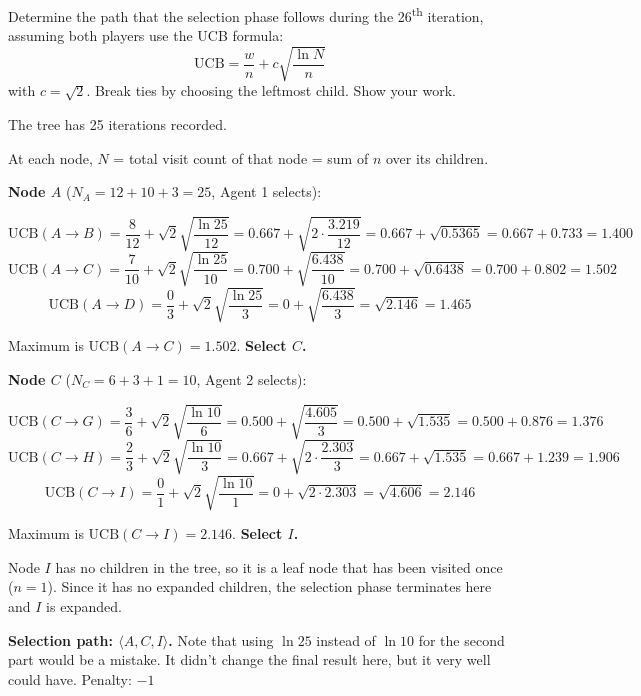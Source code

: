 \begin{enumerate}
Determine the path that the selection phase follows during the 26\textsuperscript{th} iteration, assuming both players use the UCB formula:
\[
\mathrm{UCB} = \frac{w}{n} + c\sqrt{\frac{\ln N}{n}}
\]
with $c = \sqrt{2}$. Break ties by choosing the leftmost child. Show your work.

\begin{solution}
The tree has 25 iterations recorded.

\medskip
\noindent At each node, $N$ = total visit count of that node = sum of $n$ over its children.

\medskip
\noindent \textbf{Node $A$} ($N_A = 12+10+3 = 25$, Agent 1 selects):

\[
\mathrm{UCB}(A \to B) = \frac{8}{12} + \sqrt{2}\sqrt{\frac{\ln 25}{12}} = 0.667 + \sqrt{2 \cdot \frac{3.219}{12}} = 0.667 + \sqrt{0.5365} = 0.667 + 0.733 = 1.400
\]
\[
\mathrm{UCB}(A \to C) = \frac{7}{10} + \sqrt{2}\sqrt{\frac{\ln 25}{10}} = 0.700 + \sqrt{\frac{6.438}{10}} = 0.700 + \sqrt{0.6438} = 0.700 + 0.802 = 1.502
\]
\[
\mathrm{UCB}(A \to D) = \frac{0}{3} + \sqrt{2}\sqrt{\frac{\ln 25}{3}} = 0 + \sqrt{\frac{6.438}{3}} = \sqrt{2.146} = 1.465
\]

Maximum is $\mathrm{UCB}(A \to C) = 1.502$. \textbf{Select $C$.}

\medskip
\noindent \textbf{Node $C$} ($N_C = 6+3+1 = 10$, Agent 2 selects):

\[
\mathrm{UCB}(C \to G) = \frac{3}{6} + \sqrt{2}\sqrt{\frac{\ln 10}{6}} = 0.500 + \sqrt{\frac{4.605}{3}} = 0.500 + \sqrt{1.535} = 0.500 + 0.876 = 1.376
\]
\[
\mathrm{UCB}(C \to H) = \frac{2}{3} + \sqrt{2}\sqrt{\frac{\ln 10}{3}} = 0.667 + \sqrt{2 \cdot \frac{2.303}{3}} = 0.667 + \sqrt{1.535} = 0.667 + 1.239 = 1.906
\]
\[
\mathrm{UCB}(C \to I) = \frac{0}{1} + \sqrt{2}\sqrt{\frac{\ln 10}{1}} = 0 + \sqrt{2 \cdot 2.303} = \sqrt{4.606} = 2.146
\]

Maximum is $\mathrm{UCB}(C \to I) = 2.146$. \textbf{Select $I$.}

\medskip
\noindent Node $I$ has no children in the tree, so it is a leaf node that has been visited once ($n=1$). Since it has no expanded children, the selection phase terminates here and $I$ is expanded.

\medskip
\noindent \textbf{Selection path: $\langle A, C, I \rangle$.}
Note that using $\ln 25$ instead of $\ln 10$ for the second part would be a mistake. It didn't change the final result here, but it very well could have. Penalty: $-1$
\end{solution}
\end{enumerate}
\clearpage

